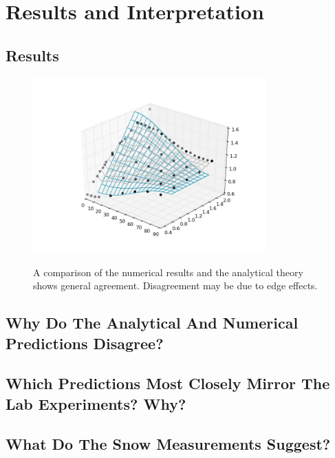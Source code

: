\chapter{Results and Interpretation}

\section{Results}

\begin{figure}[h]
\centering
\includegraphics[width=0.8\textwidth]{fig/numericalvtheoretical.png}
\label{fig:theoryresults}
\caption{A comparison of the numerical results and the analytical theory shows
general agreement. Disagreement may be due to edge effects.}
\end{figure}

\section{Why Do The Analytical And Numerical Predictions Disagree?}

\section{Which Predictions Most Closely Mirror The Lab Experiments? Why?}

\section{What Do The Snow Measurements Suggest?}
